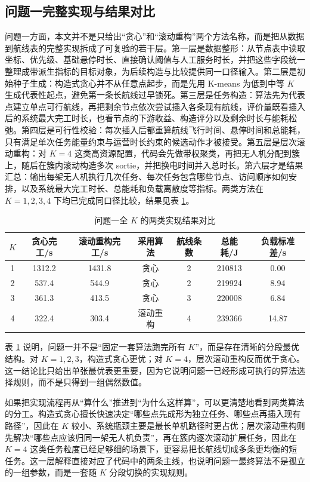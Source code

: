 \documentclass[12pt]{article}
\begin{document}
\subsection{问题一完整实现与结果对比}
问题一方面，本文并不是只给出“贪心”和“滚动重构”两个方法名称，而是把从数据到航线表的完整实现拆成了可复验的若干层。第一层是数据整形：从节点表中读取坐标、优先级、基础悬停时长、直接确认阈值与人工服务时长，并把这些字段统一整理成带派生指标的目标对象，为后续构造与比较提供同一口径输入。第二层是初始种子生成：构造式贪心并不从任意点起步，而是先用 K-means 为低到中等 $K$ 生成代表性起点，避免第一条长航线过早锁死。第三层是任务构造：算法先为代表点建立单点可行航线，再把剩余节点依次尝试插入各条现有航线，评价量既看插入后的系统最大完工时长，也看节点的下游收益、构造评分以及剩余时长与能耗松弛。第四层是可行性校验：每次插入后都重算航线飞行时间、悬停时间和总能耗，只有满足单次任务能量约束与运营时长约束的候选动作才被接受。第五层是层次滚动重构：对 $K=4$ 这类高资源配置，代码会先做带权聚类，再把无人机分配到簇上，随后在簇内滚动构造多次 sortie，并把换电时间并入总时长。第六层才是结果汇总：输出每架无人机执行几次任务、每次任务包含哪些节点、访问顺序如何安排，以及系统最大完工时长、总能耗和负载离散度等指标。两类方法在 $K=1,2,3,4$ 下均已完成同口径比较，结果见表 \ref{tab:problem1-method-compare-full}。

\begin{table}[H]
\centering
\caption{问题一全 $K$ 的两类实现结果对比}
\label{tab:problem1-method-compare-full}
\small
\setlength{\tabcolsep}{4pt}
\begin{tabular}{ccccccc}
\toprule
$K$ & 贪心完工/s & 滚动重构完工/s & 采用算法 & 航线条数 & 总能耗/J & 负载标准差/s \\
\midrule
1 & 1312.2 & 1431.8 & 贪心 & 2 & 210813 & 0.00 \\
2 & 537.4 & 544.9 & 贪心 & 2 & 219924 & 8.94 \\
3 & 361.3 & 413.5 & 贪心 & 3 & 220008 & 6.84 \\
4 & 322.4 & 303.4 & 滚动重构 & 4 & 239366 & 14.87 \\
\bottomrule
\end{tabular}
\normalsize
\end{table}

表 \ref{tab:problem1-method-compare-full} 说明，问题一并不是“固定一套算法跑完所有 $K$”，而是存在清晰的分段最优结构。对 $K=1,2,3$，构造式贪心更优；对 $K=4$，层次滚动重构反而优于贪心。这一结论比只给出单张最优表更重要，因为它说明问题一已经形成可执行的算法选择规则，而不是只得到一组偶然数值。

如果把实现流程再从“算什么”推进到“为什么这样算”，可以更清楚地看到两类算法的分工。构造式贪心擅长快速决定“哪些点先成形为独立任务、哪些点再插入现有路径”，因此在 $K$ 较小、系统瓶颈主要是最长单机路径时更占优；层次滚动重构则先解决“哪些点应该归同一架无人机负责”，再在簇内逐次滚动扩展任务，因此在 $K=4$ 这类任务粒度已经足够细的场景下，更容易把长航线切成多条更均衡的短任务。这一层解释直接对应了代码中的两条主线，也说明问题一最终算法不是孤立的一组参数，而是一套随 $K$ 分段切换的实现规则。
\end{document}
